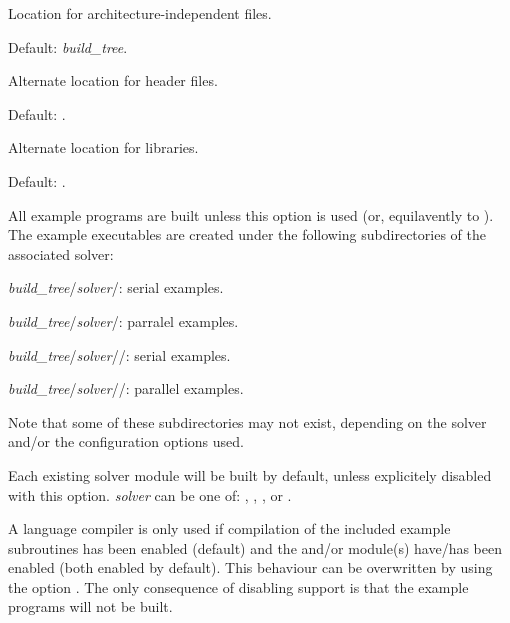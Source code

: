 \begin{config}
  
\item {}
  
  Location for architecture-independent files.
  
  Default:  {\em build\_tree}.
  
\item {}
  
  Alternate location for header files.
  
  Default: .
  
\item {}
  
  Alternate location for libraries.
  
  Default: .
  
\item {}
  
  All example programs are built unless this option is used (or, equilavently to ).  
  The example executables are created under the following subdirectories of the associated solver: 
  
  \begin{config}
  \item {\em build\_tree}/{\em solver}/: serial examples.
  \item {\em build\_tree}/{\em solver}/: parralel {\mpi} examples.
  \item {\em build\_tree}/{\em solver}//: serial {\F} examples.
  \item {\em build\_tree}/{\em solver}//: parallel {\F} examples.
  \end{config}
  
  Note that some of these subdirectories may not exist, depending on the solver and/or the configuration
  options used.
  
\item {}
  
  Each existing solver module will be built by default, unless explicitely disabled with this option.
  {\em solver} can be one of: , , , or .
  
\item {}
  
  A {\F} language compiler is only used if compilation of the included example subroutines has been 
  enabled (default) and the {\cvode} and/or {\kinsol} module(s) have/has been enabled (both enabled by default).
  This behaviour can be overwritten by using the option .
  The only consequence of disabling {\F} support is that the {\F} example programs will not be built.
  

\end{config}
